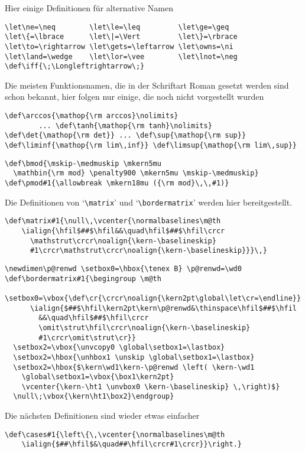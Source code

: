 \begin{appendix}
Hier einige Definitionen f\"ur alternative Namen
\begin{verbatim}
\let\ne=\neq        \let\le=\leq         \let\ge=\geq
\let\{=\lbrace      \let\|=\Vert         \let\}=\rbrace
\let\to=\rightarrow \let\gets=\leftarrow \let\owns=\ni
\let\land=\wedge    \let\lor=\vee        \let\lnot=\neg
\def\iff{\;\Longleftrightarrow\;}
\end{verbatim}
Die meisten Funktionsnamen, die in der Schriftart Roman gesetzt werden
sind schon bekannt, hier folgen nur einige, die noch nicht vorgestellt
wurden
\begin{verbatim}
\def\arccos{\mathop{\rm arccos}\nolimits}
        ... \def\tanh{\mathop{\rm tanh}\nolimits}
\def\det{\mathop{\rm det}} ... \def\sup{\mathop{\rm sup}}
\def\liminf{\mathop{\rm lim\,inf}} \def\limsup{\mathop{\rm lim\,sup}}
\end{verbatim}
\begin{verbatim}
\def\bmod{\mskip-\medmuskip \mkern5mu
  \mathbin{\rm mod} \penalty900 \mkern5mu \mskip-\medmuskip}
\def\pmod#1{\allowbreak \mkern18mu ({\rm mod}\,\,#1)}
\end{verbatim}
Die Definitionen von `\verb|\matrix|' und `\verb|\bordermatrix|'
werden hier bereitgestellt.
\begin{verbatim}
\def\matrix#1{\null\,\vcenter{\normalbaselines\m@th
    \ialign{\hfil$##$\hfil&&\quad\hfil$##$\hfil\crcr
      \mathstrut\crcr\noalign{\kern-\baselineskip}
      #1\crcr\mathstrut\crcr\noalign{\kern-\baselineskip}}}\,}
\end{verbatim}
\begin{verbatim}
\newdimen\p@renwd \setbox0=\hbox{\tenex B} \p@renwd=\wd0
\def\bordermatrix#1{\begingroup \m@th
  \setbox0=\vbox{\def\cr{\crcr\noalign{\kern2pt\global\let\cr=\endline}}
      \ialign{$##$\hfil\kern2pt\kern\p@renwd&\thinspace\hfil$##$\hfil
        &&\quad\hfil$##$\hfil\crcr
        \omit\strut\hfil\crcr\noalign{\kern-\baselineskip}
        #1\crcr\omit\strut\cr}}
  \setbox2=\vbox{\unvcopy0 \global\setbox1=\lastbox}
  \setbox2=\hbox{\unhbox1 \unskip \global\setbox1=\lastbox}
  \setbox2=\hbox{$\kern\wd1\kern-\p@renwd \left( \kern-\wd1
    \global\setbox1=\vbox{\box1\kern2pt}
    \vcenter{\kern-\ht1 \unvbox0 \kern-\baselineskip} \,\right)$}
  \null\;\vbox{\kern\ht1\box2}\endgroup}
\end{verbatim}
Die n\"achsten Definitionen sind wieder etwas einfacher
\begin{verbatim}
\def\cases#1{\left\{\,\vcenter{\normalbaselines\m@th
    \ialign{$##\hfil$&\quad##\hfil\crcr#1\crcr}}\right.}

\end{verbatim}
\end{appendix}

